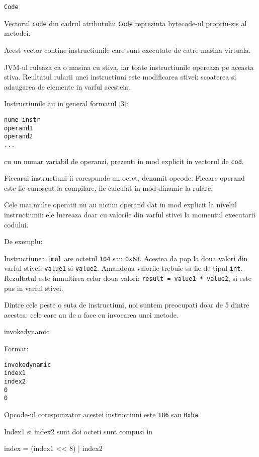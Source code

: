 \documentclass[]{article}
\newenvironment{Shaded}{}{}
\newcommand{\DecValTok}[1]{\textcolor[rgb]{0.25,0.63,0.44}{#1}}
\newcommand{\NormalTok}[1]{#1}
\begin{document}
\texttt{Code}

Vectorul \texttt{code} din cadrul atributului \texttt{Code} reprezinta
bytecode-ul propriu-zis al metodei.

Acest vector contine instructiunile care sunt executate de catre masina
virtuala.

JVM-ul ruleaza ca o masina cu stiva, iar toate instructiunile opereaza
pe aceasta stiva. Reultatul rularii unei instructiuni este modificarea
stivei: scoaterea si adaugarea de elemente in varful acesteia.

Instructiunile au in general formatul {[}3{]}:

\begin{verbatim}
nume_instr
operand1
operand2
...
\end{verbatim}

cu un numar variabil de operanzi, prezenti in mod explicit in vectorul
de \texttt{cod}.

Fiecarui instructiuni ii corespunde un octet, denumit opcode. Fiecare
operand este fie cunoscut la compilare, fie calculat in mod dinamic la
rulare.

Cele mai multe operatii nu au niciun operand dat in mod explicit la
nivelul instructiunii: ele lucreaza doar cu valorile din varful stivei
la momentul executarii codului.

De exemplu:

Instructiunea \texttt{imul} are octetul \texttt{104} sau \texttt{0x68}.
Acestea da pop la doua valori din varful stivei: \texttt{value1} si
\texttt{value2}. Amandoua valorile trebuie sa fie de tipul \texttt{int}.
Rezultatul este inmultirea celor doua valori:
\texttt{result\ =\ value1\ *\ value2}, si este pus in varful stivei.

Dintre cele peste o suta de instructiuni, noi suntem preocupati doar de
5 dintre acestea: cele care au de a face cu invocarea unei metode.

invokedynamic

Format:

\begin{verbatim}
invokedynamic
index1
index2
0
0
\end{verbatim}

Opcode-ul corespunzator acestei instructiuni este \texttt{186} sau
\texttt{0xba}.

Index1 si index2 sunt doi octeti sunt compusi in

\begin{Shaded}
	\begin{Highlighting}[]
		\NormalTok{index = (index1 << }\DecValTok{8}\NormalTok{) | index2}
	\end{Highlighting}
\end{Shaded}
\end{document}
